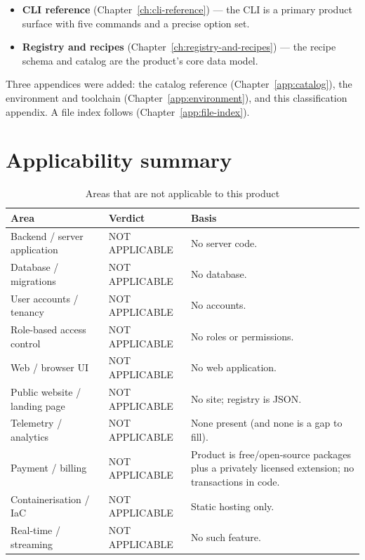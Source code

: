 \begin{itemize}
  \item \textbf{CLI reference} (Chapter~\ref{ch:cli-reference}) --- the CLI is a
        primary product surface with five commands and a precise option set.
  \item \textbf{Registry and recipes}
        (Chapter~\ref{ch:registry-and-recipes}) --- the recipe schema and catalog
        are the product's core data model.
\end{itemize}

Three appendices were added: the catalog reference
(Chapter~\ref{app:catalog}), the environment and toolchain
(Chapter~\ref{app:environment}), and this classification appendix. A file index
follows (Chapter~\ref{app:file-index}).

\section{Applicability summary}

\begin{longtable}{p{4.4cm}p{2.4cm}p{7.6cm}}
\caption{Areas that are not applicable to this product}\\
\toprule
\textbf{Area} & \textbf{Verdict} & \textbf{Basis} \\
\midrule

Backend / server application & NOT APPLICABLE & No server code. \\
Database / migrations & NOT APPLICABLE & No database. \\
User accounts / tenancy & NOT APPLICABLE & No accounts. \\
Role-based access control & NOT APPLICABLE & No roles or permissions. \\
Web / browser UI & NOT APPLICABLE & No web application. \\
Public website / landing page & NOT APPLICABLE & No site; registry is JSON. \\
Telemetry / analytics & NOT APPLICABLE & None present (and none is a gap to fill). \\
Payment / billing & NOT APPLICABLE & Product is free/open-source packages plus a
privately licensed extension; no transactions in code. \\
Containerisation / IaC & NOT APPLICABLE & Static hosting only. \\
Real-time / streaming & NOT APPLICABLE & No such feature. \\
\bottomrule
\end{longtable}

